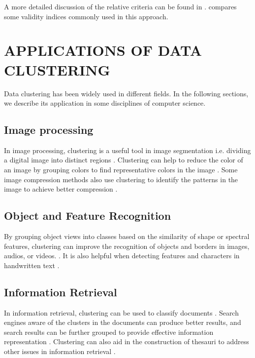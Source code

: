 \documentclass[conference]{IEEEtran}
\begin{document}
A more detailed discussion of the relative criteria can be found in \cite{Halkidi:2002:CVC:601858.601862}. \cite{bezdek1998some} compares some validity indices commonly used in this approach.

\section{APPLICATIONS OF DATA CLUSTERING} \label{sec:application}
Data clustering has been widely used in different fields. In the following sections, we describe its application in some disciplines of computer science.

\subsection{Image processing}
In image processing, clustering is a useful tool in image segmentation i.e. dividing a digital image into distinct regions \cite{haralick1985image}. Clustering can help to reduce the color of an image by grouping colors to find representative colors in the image \cite{scheunders1997comparison}. Some image compression methods also use clustering to identify the patterns in the image to achieve better compression \cite{jain1981image}.

\subsection{Object and Feature Recognition}
By grouping object views into classes based on the similarity of shape or spectral features, clustering can improve the recognition of objects and borders in images, audios, or videos. \cite{lowe2004distinctive}. It is also helpful when detecting features and characters in handwritten text \cite{lu1995machine} \cite{yin2009handwritten}.

\subsection{Information Retrieval}
In information retrieval, clustering can be used to classify documents \cite{willett1988recent} \cite{steinbach2000comparison}. Search engines aware of the clusters in the documents can produce better results, and search results can be further grouped to provide effective information representation \cite{cutting1992scatter}. Clustering can also aid in the construction of thesauri to address other issues in information retrieval \cite{lin1998automatic}.
\end{document}
